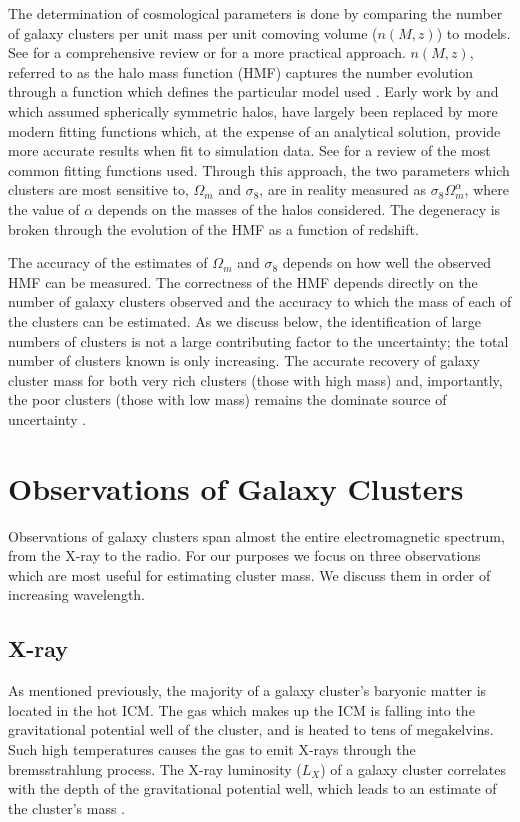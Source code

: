 The determination of cosmological parameters is done by comparing the number of galaxy clusters per unit mass per unit comoving volume ($n(M,z)$) to models. See \cite{Allen2011} for a comprehensive review or \cite{Murray2013} for a more practical approach. $n(M,z)$, referred to as the halo mass function (HMF) captures the number evolution through a function which defines the particular model used . Early work by \cite{Press1974} and \cite{Bond1991} which assumed spherically symmetric halos, have largely been replaced by more modern fitting functions which, at the expense of an analytical solution, provide more accurate results when fit to simulation data. See \cite{Murray2013} for a review of the most common fitting functions used. Through this approach, the two parameters which clusters are most sensitive to, $\Omega_m$ and $\sigma_8$, are in reality measured as $\sigma_8\Omega_m^\alpha$, where the value of $\alpha$ depends on the masses of the halos considered. The degeneracy is broken through the evolution of the HMF as a function of redshift. 

The accuracy of the estimates of $\Omega_m$ and $\sigma_8$ depends on how well the observed HMF can be measured. The correctness of the HMF depends directly on the number of galaxy clusters observed and the accuracy to which the mass of each of the clusters can be estimated. As we discuss below, the identification of large numbers of clusters is not a large contributing factor to the uncertainty; the total number of clusters known is only increasing. The accurate recovery of galaxy cluster mass for both very rich clusters (those with high mass) and, importantly, the poor clusters (those with low mass) remains the dominate source of uncertainty .

\section{Observations of Galaxy Clusters}
Observations of galaxy clusters span almost the entire electromagnetic spectrum, from the X-ray to the radio. For our purposes we focus on three observations which are most useful for estimating cluster mass. We discuss them in order of increasing wavelength.

\subsection{X-ray}
As mentioned previously, the majority of a galaxy cluster's baryonic matter is located in the hot ICM. The gas which makes up the ICM is falling into the gravitational potential well of the cluster, and is heated to tens of megakelvins. Such high temperatures causes the gas to emit X-rays through the bremsstrahlung process. The X-ray luminosity ($L_X$) of a galaxy cluster correlates with the depth of the gravitational potential well, which leads to an estimate of the cluster's mass . 

